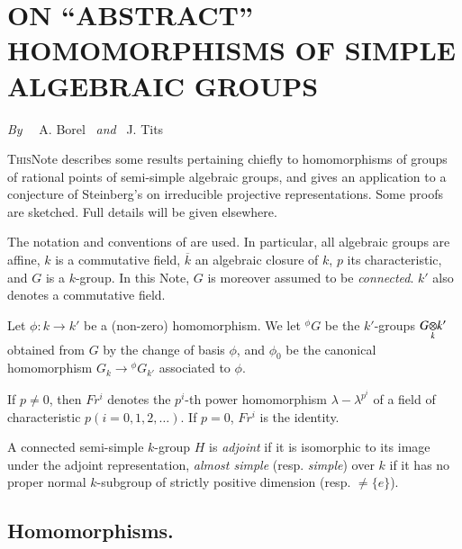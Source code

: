 \chapter[\textsc{A. Borel} and \textsc{J. Tits~:} On ``Abstract'' Homomorphisms of Simple Algebraic Groups]{ON ``ABSTRACT'' HOMOMORPHISMS OF SIMPLE ALGEBRAIC GROUPS}\label{art05}

\begin{center}
{\em By}~~ A. Borel ~{\em and}~ J. Tits
\end{center}


\setcounter{pageoriginal}{74}
\textsc{This}\pageoriginale Note describes some results pertaining chiefly to homomorphisms of groups of rational points of semi-simple algebraic groups, and gives an application to a conjecture of Steinberg's \cite{art05-key9} on irreducible projective representations. Some proofs are sketched. Full details will be given elsewhere.

\begin{notation*}
The notation and conventions of \cite{art05-key1} are used. In particular, all algebraic groups are affine, $k$ is a commutative field, $\overline{k}$ an algebraic closure of $k$, $p$ its characteristic, and $G$ is a $k$-group. In this Note, $G$ is moreover assumed to be {\em connected}. $k'$ also denotes a commutative field.
\end{notation*}

Let $\phi:k\to k'$ be a (non-zero) homomorphism. We let ${}^{\phi}G$ be the $k'$-groups $\foprod{G}{k'}{k}$ obtained from $G$ by the change of basis $\phi$, and $\phi_{0}$ be the canonical homomorphism $G_{k}\to {}^{\phi}G_{k'}$ associated to $\phi$.

If $p\neq 0$, then $Fr^{i}$ denotes the $p^{i}$-th power homomorphism $\lambda-\lambda^{p^{i}}$ of a field of characteristic $p(i=0,1,2,\ldots)$. If $p=0$, $Fr^{i}$ is the identity.

A connected semi-simple $k$-group $H$ is {\em adjoint} if it is isomorphic to its image under the adjoint representation, {\em almost simple} (resp. {\em simple}) over $k$ if it has no proper normal $k$-subgroup of strictly positive dimension (resp. $\neq \{e\}$).

\section{Homomorphisms.}\label{art05-sec1}

